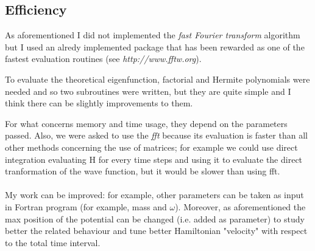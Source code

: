 \documentclass[12pt, a4paper, notitlepage]{report}
\begin{document}
\subsection*{Efficiency}

As aforementioned I did not implemented the \textit{fast Fourier transform} algorithm but I used an alredy implemented package that has been rewarded as one of the fastest evaluation routines (see \textit{http://www.fftw.org}).

To evaluate the theoretical eigenfunction, factorial and Hermite polynomials were needed and so two subroutines were written, but they are quite simple and I think there can be slightly improvements to them.

For what concerns memory and time usage, they depend on the parameters passed. Also, we were asked to use the \textit{fft} because its evaluation is faster than all other methods concerning the use of matrices; for example we could use direct integration evaluating H for every time steps and using it to evaluate the direct tranformation of the wave function, but it would be slower than using fft. \\ \\

My work can be improved: for example, other parameters can be taken as input in Fortran program (for example, mass and $\omega$). Moreover, as aforementioned the max position of the potential can be changed (i.e. added as parameter) to study better the related behaviour and tune better Hamiltonian "velocity" with respect to the total time interval.
\end{document}

